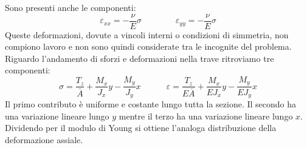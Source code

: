 Sono presenti anche le componenti:
\begin{equation*}
    \varepsilon_{xx} = -\frac{\nu}{E}\sigma \quad\quad\quad\quad  \varepsilon_{yy} = -\frac{\nu}{E}\sigma
\end{equation*}
Queste deformazioni, dovute a vincoli interni o condizioni di simmetria, non compiono lavoro e non sono quindi considerate tra le incognite del problema.\\

Riguardo l'andamento di sforzi e deformazioni nella trave ritroviamo tre componenti:
 \begin{equation*}
        \sigma = \frac{T_z}{\bar{A}} +  \frac{M_x}{J_x}y -\frac{M_y}{J_y}x \quad\quad\quad \varepsilon = \frac{T_z}{E\bar{A}} +  \frac{M_x}{EJ_x}y -\frac{M_y}{EJ_y}x 
 \end{equation*}
 Il primo contributo è uniforme e costante lungo tutta la sezione. Il secondo ha una variazione lineare lungo $y$ mentre il terzo ha una variazione lineare lungo $x$. Dividendo per il modulo di Young si ottiene l'analoga distribuzione della deformazione assiale.



